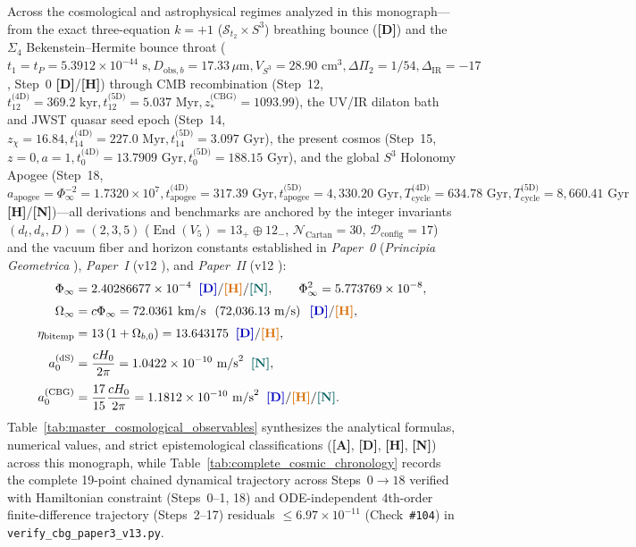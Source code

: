 \documentclass[11pt,a4paper]{article}
\newcommand{\catA}{\textbf{\textcolor{purple!80!black}{[A]}}}
\newcommand{\catD}{\textbf{\textcolor{blue!75!black}{[D]}}}
\newcommand{\catH}{\textbf{\textcolor{orange!85!black}{[H]}}}
\newcommand{\catN}{\textbf{\textcolor{teal!75!black}{[N]}}}
\theoremstyle{plain}
\theoremstyle{definition}
\theoremstyle{remark}
\numberwithin{equation}{section}
\begin{document}
Across the cosmological and astrophysical regimes analyzed in this monograph---from the exact three-equation $k = +1$ ($\mathcal{S}_{t_2} \times S^3$) breathing bounce (\catD) and the $\Sigma_4$ Bekenstein--Hermite bounce throat ($t_1 = t_P = 5.3912 \times 10^{-44}\text{ s}, D_{\text{obs},b} = 17.33\,\mu\text{m}, V_{S^3} = 28.90\text{ cm}^3, \Delta\Pi_2 = 1/54, \Delta_{\text{IR}} = -17$, Step~0 \catD/\catH) through CMB recombination (Step~12, $t_{12}^{\text{(4D)}} = 369.2\text{ kyr}, t_{12}^{\text{(5D)}} = 5.037\text{ Myr}, z_*^{\text{(CBG)}} = 1093.99$), the UV/IR dilaton bath and JWST quasar seed epoch (Step~14, $z_\chi = 16.84, t_{14}^{\text{(4D)}} = 227.0\text{ Myr}, t_{14}^{\text{(5D)}} = 3.097\text{ Gyr}$), the present cosmos (Step~15, $z = 0, a = 1, t_0^{\text{(4D)}} = 13.7909\text{ Gyr}, t_0^{\text{(5D)}} = 188.15\text{ Gyr}$), and the global $S^3$ Holonomy Apogee (Step~18, $a_{\text{apogee}} = \Phi_{\infty}^{-2} = 1.7320 \times 10^7, t_{\text{apogee}}^{\text{(4D)}} = 317.39\text{ Gyr}, t_{\text{apogee}}^{\text{(5D)}} = 4{,}330.20\text{ Gyr}, T_{\text{cycle}}^{\text{(4D)}} = 634.78\text{ Gyr}, T_{\text{cycle}}^{\text{(5D)}} = 8{,}660.41\text{ Gyr}$ \catH/\catN)---all derivations and benchmarks are anchored by the integer invariants $(d_t, d_s, D) = (2, 3, 5)$ ($\operatorname{End}(V_5) = 13_+ \oplus 12_-$, $\mathcal{N}_{\text{Cartan}} = 30$, $\mathcal{D}_{\text{config}} = 17$) and the vacuum fiber and horizon constants established in \textit{Paper~0} (\textit{Principia Geometrica} \cite{jimenez2026_p0}), \textit{Paper~I} (v12 \cite{jimenez2026a}), and \textit{Paper~II} (v12 \cite{jimenez2026b}):
\begin{align}
\Phi_{\infty} &= 2.40286677 \times 10^{-4} \;\;\catD/\catH/\catN, \qquad \Phi_{\infty}^2 = 5.773769 \times 10^{-8}, \nonumber \\[3pt]
\Omega_{\infty} &= c\Phi_{\infty} = 72.0361\text{ km/s} \;\; \left(72{,}036.13\text{ m/s}\right) \;\;\catD/\catH, \nonumber \\[3pt]
\eta_{\text{bitemp}} &= 13\left(1 + \Omega_{b,0}\right) = 13.643175 \;\;\catD/\catH, \nonumber \\[3pt]
a_0^{\text{(dS)}} &= \frac{cH_0}{2\pi} = 1.0422 \times 10^{-10}\text{ m/s}^2 \;\;\catN, \nonumber \\[3pt]
a_0^{\text{(CBG)}} &= \frac{17}{15}\frac{cH_0}{2\pi} = 1.1812 \times 10^{-10}\text{ m/s}^2 \;\;\catD/\catH/\catN.
\label{eq:master_synthesis_constants_p3}
\end{align}
Table~\ref{tab:master_cosmological_observables} synthesizes the analytical formulas, numerical values, and strict epistemological classifications (\catA, \catD, \catH, \catN) across this monograph, while Table~\ref{tab:complete_cosmic_chronology} records the complete 19-point chained dynamical trajectory across Steps~$0 \to 18$ verified with Hamiltonian constraint (Steps~0--1, 18) and ODE-independent 4th-order finite-difference trajectory (Steps~2--17) residuals $\le 6.97 \times 10^{-11}$ (Check~\texttt{\#104}) in \allowbreak\texttt{verify\_cbg\_paper3\_v13.py}.
\end{document}

